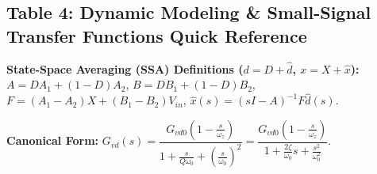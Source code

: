 \vspace{-4pt}
\subsection{Table 4: Dynamic Modeling \& Small-Signal Transfer Functions Quick Reference}
\vspace{-4pt}

\noindent\textbf{State-Space Averaging (SSA) Definitions ($d = D + \hat{d}$, $x = X + \hat{x}$):}
$A = D A_1 + (1-D) A_2$, $B = D B_1 + (1-D) B_2$, $F = (A_1 - A_2)X + (B_1 - B_2)V_{in}$,
$\hat{x}(s) = (sI - A)^{-1} F \hat{d}(s)$. \par\vspace{1pt}
\noindent\textbf{Canonical Form:} $G_{vd}(s) = \dfrac{G_{vd0} \left(1 - \frac{s}{\omega_z}\right)}{1 + \frac{s}{Q \omega_0} + \left(\frac{s}{\omega_0}\right)^2} = \dfrac{G_{vd0} \left(1 - \frac{s}{\omega_z}\right)}{1 + \frac{2\zeta}{\omega_0} s + \frac{s^2}{\omega_0^2}}$.

